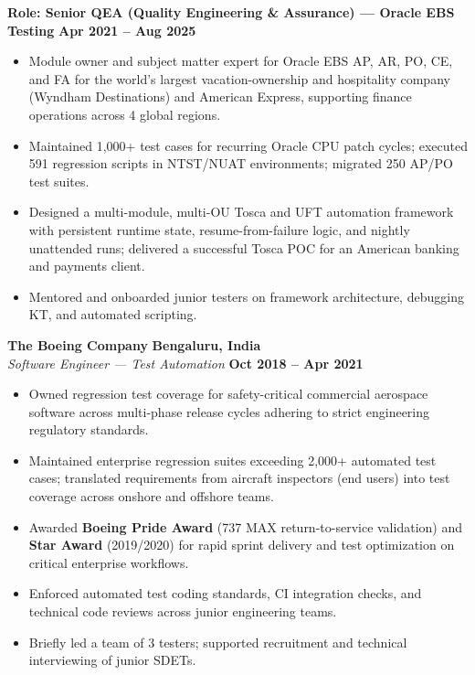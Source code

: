 \documentclass[10pt,a4paper]{article}
\begin{document}
\vspace{1pt}
\noindent
\textbf{Role: Senior QEA (Quality Engineering \& Assurance) --- Oracle EBS Testing} \hfill \textbf{Apr 2021 -- Aug 2025}
\begin{itemize}[leftmargin=*,noitemsep,topsep=1pt]
    \item Module owner and subject matter expert for Oracle EBS AP, AR, PO, CE, and FA for the world's largest vacation-ownership and hospitality company (Wyndham Destinations) and American Express, supporting finance operations across 4 global regions.
    \item Maintained 1,000+ test cases for recurring Oracle CPU patch cycles; executed 591 regression scripts in NTST/NUAT environments; migrated 250 AP/PO test suites.
    \item Designed a multi-module, multi-OU Tosca and UFT automation framework with persistent runtime state, resume-from-failure logic, and nightly unattended runs; delivered a successful Tosca POC for an American banking and payments client.
    \item Mentored and onboarded junior testers on framework architecture, debugging KT, and automated scripting.
\end{itemize}

\vspace{1pt}
\noindent
\textbf{The Boeing Company} \hfill \textbf{Bengaluru, India}\\
\textit{Software Engineer --- Test Automation} \hfill \textbf{Oct 2018 -- Apr 2021}
\begin{itemize}[leftmargin=*,noitemsep,topsep=1pt]
    \item Owned regression test coverage for safety-critical commercial aerospace software across multi-phase release cycles adhering to strict engineering regulatory standards.
    \item Maintained enterprise regression suites exceeding 2,000+ automated test cases; translated requirements from aircraft inspectors (end users) into test coverage across onshore and offshore teams.
    \item Awarded \textbf{Boeing Pride Award} (737 MAX return-to-service validation) and \textbf{Star Award} (2019/2020) for rapid sprint delivery and test optimization on critical enterprise workflows.
    \item Enforced automated test coding standards, CI integration checks, and technical code reviews across junior engineering teams.
    \item Briefly led a team of 3 testers; supported recruitment and technical interviewing of junior SDETs.
\end{itemize}
\end{document}
